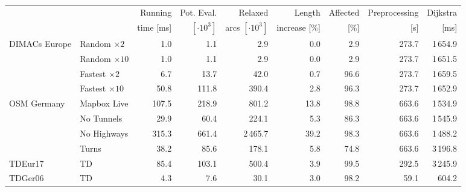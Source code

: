 \begin{tabular}{llrrrrrrr}
\toprule
 & &   Running &     Pot. Eval. &             Relaxed &        Length & Affected & Preprocessing & Dijkstra \\ & & time [ms] & $[\cdot 10^3]$ & arcs $[\cdot 10^3]$ & increase [\%] &     [\%] &           [s] &     [ms] \\
\midrule
DIMACs Europe & Random $\times 2$ &              1.0 &            1.1 &               2.9 &       0.0 &       2.9 &                         273.7 &                    1\,654.9 \\
        & Random $\times 10$ &              1.0 &            1.1 &               2.9 &       0.0 &       2.9 &                         273.7 &                    1\,651.5 \\
        & Fastest $\times 2$ &              6.7 &           13.7 &              42.0 &       0.7 &      96.6 &                         273.7 &                    1\,659.5 \\
        & Fastest $\times 10$ &             50.8 &          111.8 &             390.4 &       2.8 &      96.3 &                         273.7 &                    1\,652.9 \\
\addlinespace
OSM Germany & Mapbox Live &            107.5 &          218.9 &             801.2 &      13.8 &      98.8 &                         663.6 &                    1\,534.9 \\
        & No Tunnels &             29.9 &           60.4 &             224.1 &       5.3 &      86.3 &                         663.6 &                    1\,545.9 \\
        & No Highways &            315.3 &          661.4 &            2\,465.7 &      39.2 &      98.3 &                         663.6 &                    1\,488.2 \\
        & Turns &             38.2 &           85.6 &             178.1 &       5.8 &      74.8 &                         663.6 &                    3\,196.8 \\
\addlinespace
TDEur17 & TD &             85.4 &          103.1 &             500.4 &       3.9 &      99.5 &                         292.5 &                    3\,245.9 \\
TDGer06 & TD &              4.3 &            7.6 &              30.1 &       3.0 &      98.2 &                          59.1 &                     604.2 \\
\bottomrule
\end{tabular}


